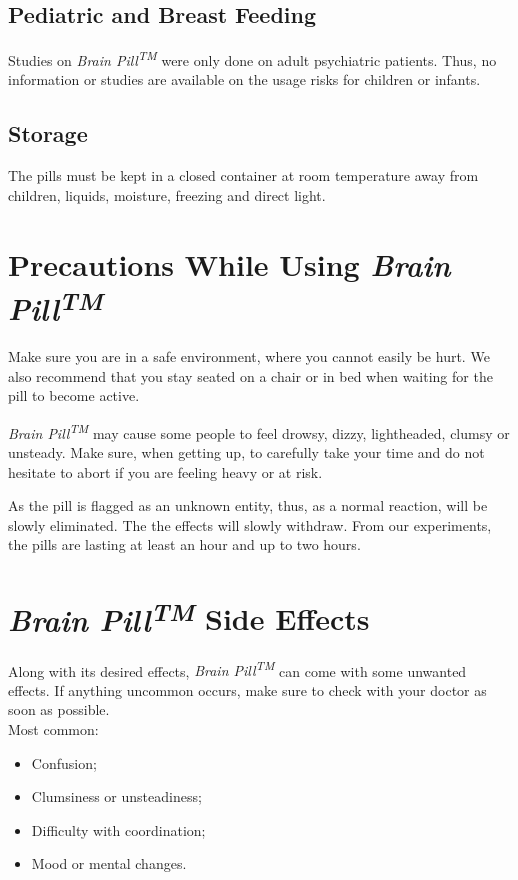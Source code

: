 \documentclass[10.5pt]{article}
\newcommand{\tm}{\emph{Brain Pill\nth{TM} }}
\newcommand{\nth}{\textsuperscript}
\begin{document}
  \subsection{Pediatric and Breast Feeding}
    Studies on \tm were only done on adult psychiatric patients. 
    Thus, no information or studies are available on the usage risks for children or infants.
    
  \subsection{Storage}
    The pills must be kept in a closed container at room temperature 
    away from children, liquids, moisture, freezing and direct light.
    
  \section{Precautions While Using \tm}
    Make sure you are in a safe environment, where you cannot easily be hurt.
    We also recommend that you stay seated on a chair or in bed 
    when waiting for the pill to become active.
    
    \tm may cause some people to feel drowsy, dizzy, lightheaded, clumsy or unsteady.
    Make sure, when getting up, to carefully take your time 
    and do not hesitate to abort if you are feeling heavy or at risk.

    As the pill is flagged as an unknown entity, thus, as a normal reaction, 
    will be slowly eliminated. The the effects will slowly withdraw. 
    From our experiments, the pills are lasting at least an hour and up to two hours.
    
  \section{\tm Side Effects}
    Along with its desired effects, \tm can come with some unwanted effects.
    If anything uncommon occurs, make sure to check with your doctor as soon as possible.\\
    
    \noindent Most common:
    \begin{itemize}
      \item Confusion;
      \item Clumsiness or unsteadiness;
      \item Difficulty with coordination;
      \item Mood or mental changes.
    \end{itemize}
    
\end{document}

